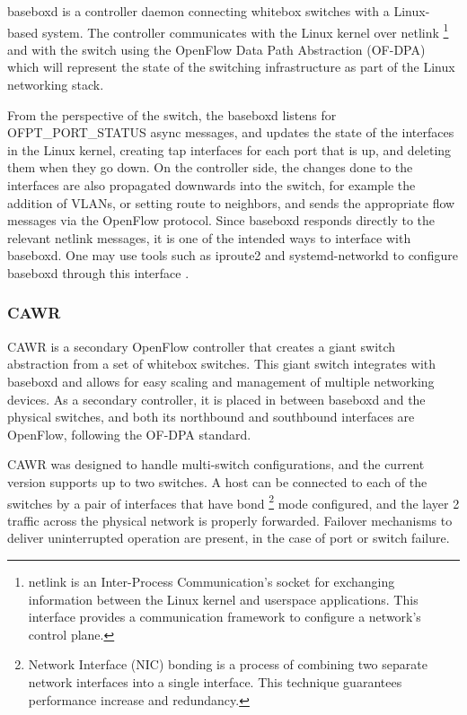 baseboxd is a controller daemon connecting whitebox switches with a Linux-based system. The controller communicates with the Linux kernel over netlink 
\footnote{netlink is an Inter-Process Communication's socket for exchanging information between the Linux kernel and userspace applications. This interface provides
a communication framework to configure a network's control plane.} and with the switch using the OpenFlow Data Path Abstraction (OF-DPA) which will represent the
state of the switching infrastructure as part of the Linux networking stack.

\par From the perspective of the switch, the baseboxd listens for OFPT\_PORT\_STATUS async messages, and updates the state of the interfaces in the Linux
kernel, creating tap interfaces for each port that is up, and deleting them when they go down. On the controller side, the changes done to the interfaces are also
propagated downwards into the switch, for example the addition of VLANs, or setting route to neighbors, and sends the appropriate flow messages via the OpenFlow 
protocol. Since baseboxd responds directly to the relevant netlink messages, it is one of the intended ways to interface with baseboxd. One may use tools such as
iproute2 and systemd-networkd to configure baseboxd through this interface \cite{bisdn_gmbh_software_2017}.

\subsubsection {CAWR}

CAWR is a secondary OpenFlow controller that creates a giant switch abstraction from a set of whitebox switches. This 
giant switch integrates with baseboxd and allows for easy scaling and management of multiple networking devices. As a secondary controller, it is placed in
between baseboxd and the physical switches, and both its northbound and southbound interfaces are OpenFlow, following the OF-DPA standard.

\par CAWR was designed to handle multi-switch configurations, and the current version supports up to two switches. A host can be connected to each of the switches by
a pair of interfaces that have bond \footnote{Network Interface (NIC) bonding is a process of combining two separate network interfaces into a single 
interface. This technique guarantees performance increase and redundancy.} mode configured, and the layer 2 traffic across the physical network is properly
forwarded. Failover mechanisms to deliver
uninterrupted operation are present, in the case of port or switch failure.

